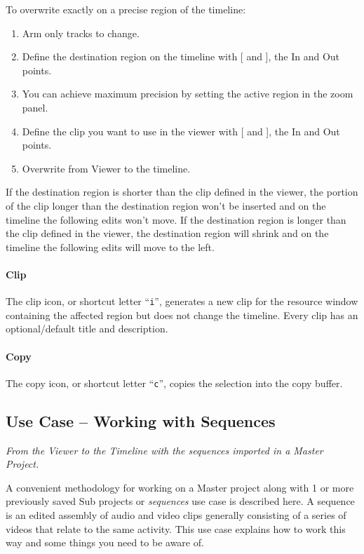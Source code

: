 To overwrite exactly on a precise region of the timeline:

\begin{enumerate} [noitemsep]
\item Arm only tracks to change.
\item Define the destination region on the timeline with [ and
  ], the In and Out points.
\item You can achieve maximum precision by setting the active
  region in the zoom panel.
\item Define the clip you want to use in the viewer with [ and
  ], the In and Out points.
\item Overwrite from Viewer to the timeline.
\end{enumerate}

If the destination region is shorter than the clip defined in the
viewer, the portion of the clip longer than the destination region
won't be inserted and on the timeline the following edits won't
move.  If the destination region is longer than the clip defined in
the viewer, the destination region will shrink and on the timeline
the following edits will move to the left.

\paragraph{Clip} The clip icon, or shortcut letter “\texttt{i}”,
generates a new clip for the resource window containing the affected
region but does not change the timeline.  Every clip has an
optional/default title and description.

\paragraph{Copy} The copy icon, or shortcut letter “\texttt{c}”,
copies the selection into the copy buffer.

\subsection{Use Case – Working with Sequences}
\label{sub:use_case_working_sequences}

\textit{From the Viewer to the Timeline with the sequences imported
  in a Master Project.}

A convenient methodology for working on a Master project along with
1 or more previously saved Sub projects or \textit{sequences} use
case is described here.  A sequence is an edited assembly of audio
and video clips generally consisting of a series of videos that
relate to the same activity. This use case explains how to work this
way and some things you need to be aware of.

